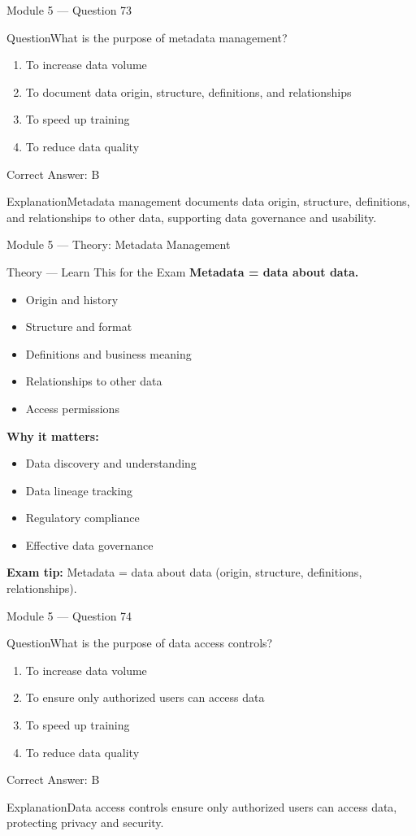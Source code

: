 \documentclass[aspectratio=169,10pt]{beamer}
\newcommand{\question}[1]{\begin{block}{Question}#1\end{block}}
\newcommand{\options}[4]{%
	\begin{enumerate}[label=\Alph*.,leftmargin=*]
		\item #1
		\item #2
		\item #3
		\item #4
	\end{enumerate}
}
\newcommand{\answerbox}[1]{\begin{exampleblock}{Correct Answer: #1}\end{exampleblock}}
\newcommand{\explain}[1]{\begin{block}{Explanation}#1\end{block}}
\newcommand{\theory}[1]{%
	\begin{block}{Theory --- Learn This for the Exam}
		\small #1
	\end{block}
}
\begin{document}
	\begin{frame}{Module 5 --- Question 73}
		\question{What is the purpose of metadata management?}
		\options{To increase data volume}{To document data origin, structure, definitions, and relationships}{To speed up training}{To reduce data quality}
		\answerbox{B}
		\explain{Metadata management documents data origin, structure, definitions, and relationships to other data, supporting data governance and usability.}
	\end{frame}
	
	\begin{frame}{Module 5 --- Theory: Metadata Management}
		\theory{
			\textbf{Metadata = data about data.}
			\begin{itemize}
				\item Origin and history
				\item Structure and format
				\item Definitions and business meaning
				\item Relationships to other data
				\item Access permissions
			\end{itemize}
			\textbf{Why it matters:}
			\begin{itemize}
				\item Data discovery and understanding
				\item Data lineage tracking
				\item Regulatory compliance
				\item Effective data governance
			\end{itemize}
			\textbf{Exam tip:} Metadata = data about data (origin, structure, definitions, relationships).
		}
	\end{frame}
	
	\begin{frame}{Module 5 --- Question 74}
		\question{What is the purpose of data access controls?}
		\options{To increase data volume}{To ensure only authorized users can access data}{To speed up training}{To reduce data quality}
		\answerbox{B}
		\explain{Data access controls ensure only authorized users can access data, protecting privacy and security.}
	\end{frame}
	
\end{document}
